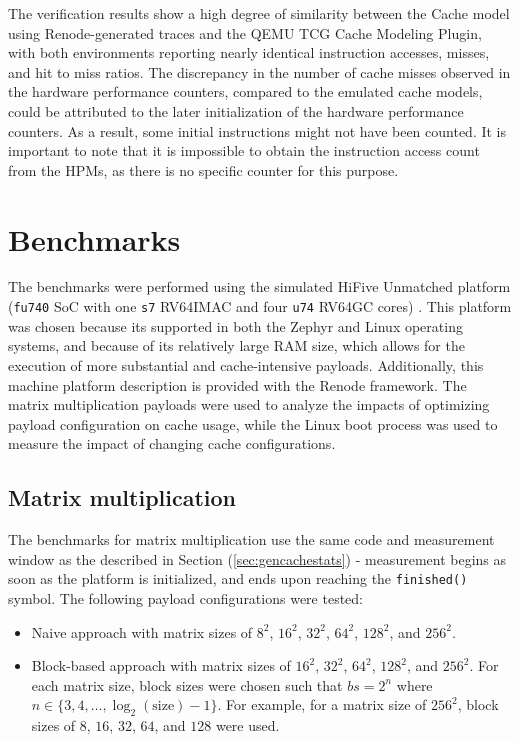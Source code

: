\noindent The verification results show a high degree of similarity between the Cache model using Renode-generated traces and the QEMU TCG Cache Modeling Plugin, with both environments
reporting nearly identical instruction accesses, misses, and hit to miss ratios. The discrepancy in the number of cache misses observed in the hardware performance counters,
compared to the emulated cache models, could be attributed to the later initialization of the hardware performance counters. As a result, some initial instructions might not have
been counted. It is important to note that it is impossible to obtain the instruction access count from the HPMs, as there is no specific counter for this purpose.

\section{Benchmarks}

The benchmarks were performed using the simulated HiFive Unmatched platform (\texttt{fu740} SoC with one \texttt{s7} RV64IMAC and four \texttt{u74} RV64GC cores) \cite{fu740docs}.
This platform was chosen because its supported in both the Zephyr and Linux operating systems, and because of its relatively large RAM size, which allows for the execution of more substantial
and cache-intensive payloads. Additionally, this machine platform description is provided with the Renode framework.
The matrix multiplication payloads were used to analyze the impacts of optimizing payload configuration on cache usage, while the Linux boot process was used to measure the
impact of changing cache configurations.

\subsection{Matrix multiplication}

The benchmarks for matrix multiplication use the same code and measurement window as the described in Section (\ref{sec:gencachestats}) - measurement begins as soon
as the platform is initialized, and ends upon reaching the \texttt{finished()} symbol.
The following payload configurations were tested:
\begin{itemize}
	\item Naive approach with matrix sizes of $8^2$, $16^2$, $32^2$, $64^2$, $128^2$, and $256^2$.
	\item Block-based approach with matrix sizes of $16^2$, $32^2$, $64^2$, $128^2$, and $256^2$. For each matrix size, block sizes were chosen such that $bs = 2^n$ where
		$n \in \{3, 4, \ldots, \log_2(\text{size}) - 1\}$. For example, for a matrix size of $256^2$, block sizes of $8$, $16$, $32$, $64$, and $128$ were used.
\end{itemize}

